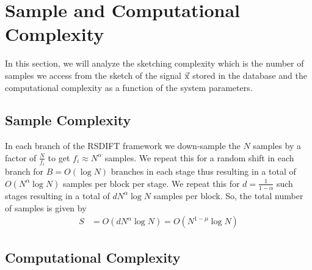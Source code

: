 \section{Sample and Computational Complexity}
\label{Sec:Complexity}
In this section, we will analyze the sketching complexity which is the  number of samples we access from the sketch of the signal $\vec{\mathrm{x}}$ stored in the database and the computational complexity as a function of the system parameters.

\subsection{\bf Sample Complexity}\label{subsec:SampleComplexity}
In each branch of the RSDIFT framework we down-sample the $N$ samples by a factor of $\frac{N}{f_i}$ to get $f_i\approx N^{\alpha}$ samples. We repeat this for a random shift in each branch for $B=O(\log N)$ branches in each stage thus resulting in a total of $O(N^{\alpha}\log N)$ samples per block per stage. We repeat this for $d = \frac{1}{1-\alpha}$ such stages resulting in a total of $dN^{\alpha}\log N$ samples per block. So, the total number of samples is given by
\begin{align*}
S&= O \left(dN^{\alpha}\log N\right) =   O(N^{1-\mu}\log N)
\end{align*}


\subsection{\bf Computational Complexity} \label{subsec:ComputationComplexity}

